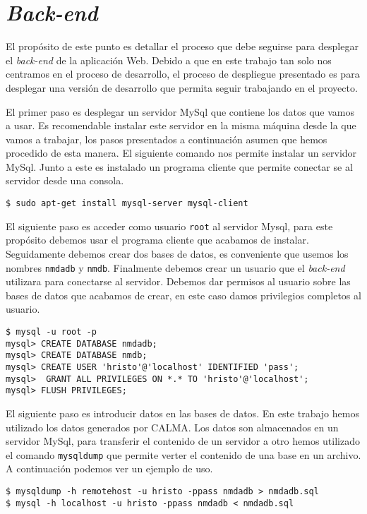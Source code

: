 \section{\emph{Back-end}}
	\label{app_back}
	El propósito de este punto es detallar el proceso que debe seguirse para desplegar el \emph{back-end} de la aplicación Web. Debido a que en
	este trabajo tan solo nos centramos en el proceso de desarrollo, el proceso de despliegue presentado es para desplegar una versión de
	desarrollo que permita seguir trabajando en el proyecto.
	\par
	El primer paso es desplegar un servidor MySql que contiene los datos que vamos a usar. Es recomendable instalar este servidor en la misma
	máquina desde la que vamos a trabajar, los pasos presentados a continuación asumen que hemos procedido de esta manera. El siguiente comando
	nos permite instalar un servidor MySql. Junto a este es instalado un programa cliente que permite conectar se al servidor desde una consola.
	\begin{lstlisting}[style=myBash]
$ sudo apt-get install mysql-server mysql-client
	\end{lstlisting}
	El siguiente paso es acceder como usuario \texttt{root} al servidor Mysql, para este propósito debemos usar el programa cliente que acabamos
	de instalar. Seguidamente debemos crear dos bases de datos, es conveniente que usemos los nombres \texttt{nmdadb} y \texttt{nmdb}. Finalmente
	debemos crear un usuario que el \emph{back-end} utilizara para conectarse al servidor. Debemos dar permisos al usuario sobre las bases de
	datos que acabamos de crear, en este caso damos privilegios completos al usuario.
	\begin{lstlisting}[style=myBash]
$ mysql -u root -p
mysql> CREATE DATABASE nmdadb;
mysql> CREATE DATABASE nmdb;
mysql> CREATE USER 'hristo'@'localhost' IDENTIFIED 'pass';
mysql>  GRANT ALL PRIVILEGES ON *.* TO 'hristo'@'localhost';
mysql> FLUSH PRIVILEGES;
	\end{lstlisting}
	El siguiente paso es introducir datos en las bases de datos. En este trabajo hemos utilizado los datos generados por CALMA. Los datos son
	almacenados en un servidor MySql, para transferir el contenido de un servidor a otro hemos utilizado el comando \texttt{mysqldump} que permite
	verter el contenido de una base en un archivo. A continuación podemos ver un ejemplo de uso.
	\begin{lstlisting}[style=myBash]
$ mysqldump -h remotehost -u hristo -ppass nmdadb > nmdadb.sql
$ mysql -h localhost -u hristo -ppass nmdadb < nmdadb.sql
	\end{lstlisting}
